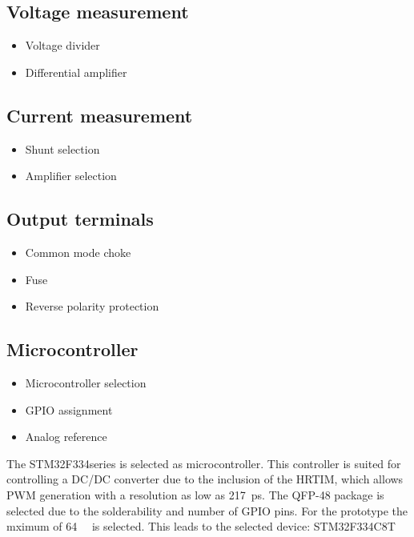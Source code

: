 \FloatBarrier

\subsection{Voltage measurement}
\label{sec_volt_meas}
\begin{itemize}
    \item Voltage divider
    \item Differential amplifier
\end{itemize}

\FloatBarrier

\subsection{Current measurement}
\label{sec_cur_meas}
\begin{itemize}
    \item Shunt selection
    \item Amplifier selection
\end{itemize}

\FloatBarrier

\subsection{Output terminals}
\label{sec_out_term}
\begin{itemize}
    \item Common mode choke
    \item Fuse
    \item Reverse polarity protection
\end{itemize}

\FloatBarrier

\subsection{Microcontroller}
\label{sec_microcontroller}
\begin{itemize}
    \item Microcontroller selection
    \item GPIO assignment
    \item Analog reference
\end{itemize}
The STM32F334series is selected as microcontroller. This controller is suited for controlling a DC/DC converter due to the inclusion of the \ac{HRTIM}, which allows \ac{PWM} generation with a resolution as low as \qty{217}{\pico\second}. The QFP-48 package is selected due to the solderability and number of \ac{GPIO} pins. For the prototype the mximum of \qty{64}{\kibi\byte} is selected. This leads to the selected device: STM32F334C8T

